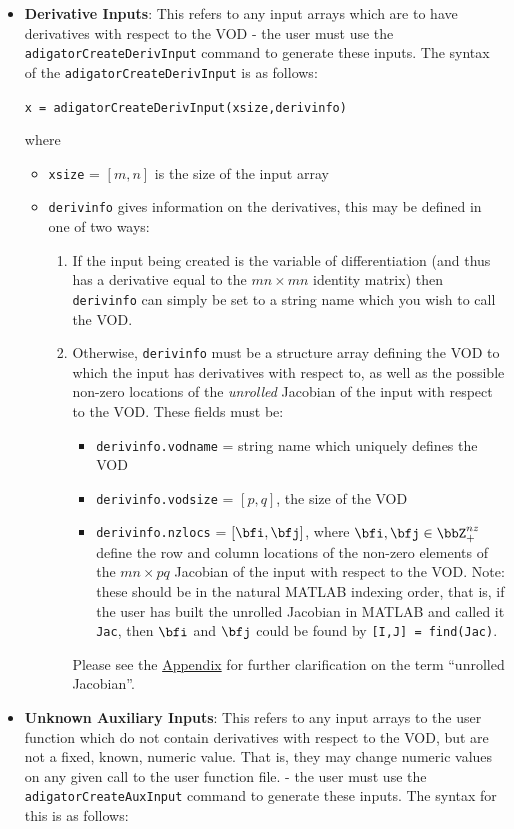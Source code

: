 \documentclass[10pt,pdftex]{article}
\begin{document}
\begin{itemize}


\item {\bf Derivative Inputs}: This refers to any input arrays which are to have derivatives with respect to the VOD - the user must use the \texttt{adigatorCreateDerivInput} command to generate these inputs. The syntax of the \texttt{adigatorCreateDerivInput} is as follows:\\
\centerline{\texttt{x = adigatorCreateDerivInput(xsize,derivinfo)}}
where
\begin{itemize}
\item \texttt{xsize} = $[m,n]$ is the size of the input array
\item \texttt{derivinfo} gives information on the derivatives, this may be defined in one of two ways:\\
\begin{enumerate}
\item If the input being created is the variable of differentiation (and thus has a derivative equal to the $mn \times mn$ identity matrix) then \texttt{derivinfo} can simply be set to a string name which you wish to call the VOD.
\item Otherwise, \texttt{derivinfo} must be a structure array defining the VOD to which the input has derivatives with respect to, as well as the possible non-zero locations of the \emph{unrolled} Jacobian of the input with respect to the VOD. These fields must be:
\begin{itemize}
\item \texttt{derivinfo.vodname} = string name which uniquely defines the VOD
\item \texttt{derivinfo.vodsize} = $[p,q]$, the size of the VOD
\item \texttt{derivinfo.nzlocs} = $[\bfi,\bfj]$, where $\bfi,\bfj \in \bbZ_+^{nz}$ define the row and column locations of the non-zero elements of the $mn \times pq$ Jacobian of the input with respect to the VOD. Note: these should be in the natural MATLAB indexing order, that is, if the user has built the unrolled Jacobian in MATLAB and called it \texttt{Jac}, then $\bfi$ and $\bfj$ could be found by \texttt{[I,J] = find(Jac)}. 
\end{itemize}
Please see the \hyperlink{Appendix}{Appendix} for further clarification on the term ``unrolled Jacobian''.
\end{enumerate}
\end{itemize}
\item {\bf Unknown Auxiliary Inputs}: This refers to any input arrays to the user function which do not contain derivatives with respect to the VOD, but are not a fixed, known, numeric value. That is, they may change numeric values on any given call to the user function file. - the user must use the \texttt{adigatorCreateAuxInput} command to generate these inputs. The syntax for this is as follows:\\

\end{itemize}
\end{document}
